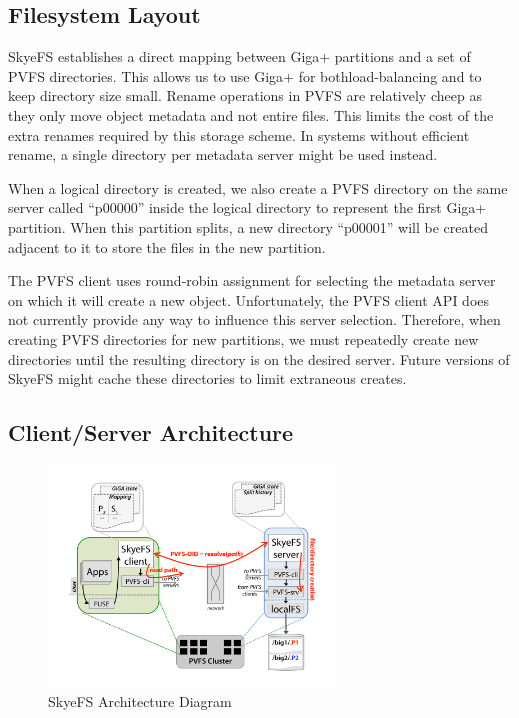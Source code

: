 \documentclass[onecolumn, 11pt, letterpaper]{article}
\begin{document}
\subsection{Filesystem Layout}
SkyeFS establishes a direct mapping between Giga+ partitions and a set of PVFS
directories.  This allows us to use Giga+ for bothload-balancing and
to keep directory size small.  Rename operations in PVFS are relatively
cheep as they only move object metadata and not entire files.  This limits the
cost of the extra renames required by this storage scheme.  In systems without
efficient rename, a single directory per metadata server might be used
instead.

When a logical directory is created, we also create a PVFS directory on the
same server called ``p00000'' inside the logical directory to represent the
first Giga+ partition.  When this partition splits, a new directory ``p00001''
will be created adjacent to it to store the files in the new partition.  

The PVFS client uses round-robin assignment for selecting the metadata server
on which it will create a new  object.  Unfortunately, the PVFS client API
does not currently provide any way to influence this server selection.
Therefore, when creating PVFS directories for new partitions, we must 
repeatedly create new directories until the resulting directory is on the
desired server.  Future versions of SkyeFS might cache these directories to
limit extraneous creates.

\subsection{Client/Server Architecture}
\begin{figure}
\begin{center}
\includegraphics[width=3in]{figure-architecture}
\end{center}
\caption{SkyeFS Architecture Diagram}
\end{figure}
\end{document}
